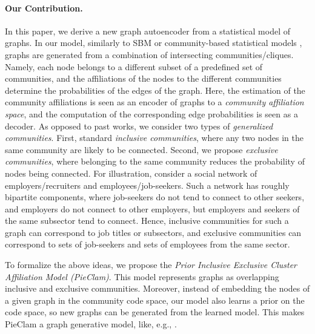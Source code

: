 \documentclass[letterpaper]{article} %
\newcommand{\ron}[1]{{{\textcolor{red}{\textbf{[Ron:} {#1}\textbf{]}}}}}
\begin{document}
\paragraph{Our Contribution.} In this paper, we derive a new graph autoencoder from a statistical model of graphs. In our model, similarly to SBM \cite{nowicki2001estimation,lee2019review} or community-based statistical models  \cite{airoldi2008mixed,yang2013BigClam}, graphs are generated from a combination of intersecting communities/cliques. Namely, each node belongs to a different subset of a predefined set of communities, and the affiliations of the nodes to the different communities determine the probabilities of the edges of the graph. Here, the estimation of the community affiliations is seen as an encoder of graphs to a  \emph{community affiliation space}, and the computation of the corresponding edge probabilities is seen as a decoder. As opposed to past works, we consider two types of \emph{generalized communities}. First, standard \emph{inclusive communities}, where any two nodes in the same community are likely to be connected. Second, we propose \emph{exclusive communities}, where belonging to the same community reduces the probability of nodes being connected. For illustration, consider a social network of employers/recruiters and employees/job-seekers. Such a network has roughly bipartite components, where job-seekers do not tend to connect to other seekers, and employers do not connect to other employers, but employers and seekers of the same subsector tend to connect. Hence, inclusive communities for such a graph can correspond to job titles or subsectors, and exclusive communities can correspond to sets of job-seekers and sets of employees from the same sector. %

To formalize the above ideas, we propose the \emph{Prior Inclusive Exclusive Cluster Affiliation Model (PieClam)}. This model represents graphs as overlapping inclusive and exclusive communities. Moreover, instead of embedding the nodes of a given graph in the community code space, our model also learns a prior on the code space, so new graphs can be generated from the learned model. This makes PieClam a graph generative model, like, e.g.,  \cite{kipf2016variational,grover2019graphite,JMLR:v21:19-671,mehta2019stochastic,sun2019vgraph}. 
\end{document}
